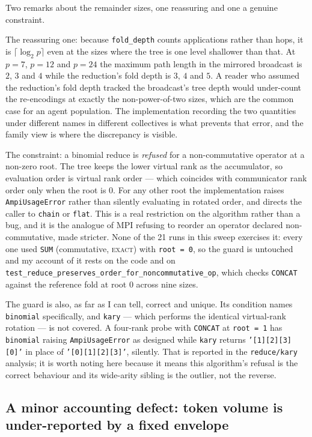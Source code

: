 \documentclass[11pt]{article}
\begin{document}
Two remarks about the remainder sizes, one reassuring and one a genuine constraint.

The reassuring one: because \texttt{fold\_depth} counts applications rather than hops, it is
$\lceil\log_2 p\rceil$ even at the sizes where the tree is one level shallower than that. At
$p=7$, $p=12$ and $p=24$ the maximum path length in the mirrored broadcast is $2$, $3$ and $4$
while the reduction's fold depth is $3$, $4$ and $5$. A reader who assumed the reduction's fold
depth tracked the broadcast's tree depth would under-count the re-encodings at exactly the
non-power-of-two sizes, which are the common case for an agent population. The implementation
recording the two quantities under different names in different collectives is what prevents
that error, and the family view is where the discrepancy is visible.

The constraint: a binomial reduce is \emph{refused} for a non-commutative operator at a non-zero
root. The tree keeps the lower virtual rank as the accumulator, so evaluation order is virtual
rank order --- which coincides with communicator rank order only when the root is $0$. For any
other root the implementation raises \texttt{AmpiUsageError} rather than silently evaluating in
rotated order, and directs the caller to \texttt{chain} or \texttt{flat}. This is a real
restriction on the algorithm rather than a bug, and it is the analogue of MPI refusing to
reorder an operator declared non-commutative, made stricter. None of the 21 runs in this sweep
exercises it: every one used \texttt{SUM} (commutative, \textsc{exact}) with \texttt{root = 0},
so the guard is untouched and my account of it rests on the code and on
\texttt{test\_reduce\_preserves\_order\_for\_noncommutative\_op}, which checks \texttt{CONCAT}
against the reference fold at root $0$ across nine sizes.

The guard is also, as far as I can tell, correct and unique. Its condition names
\texttt{binomial} specifically, and \texttt{kary} --- which performs the identical virtual-rank
rotation --- is not covered. A four-rank probe with \texttt{CONCAT} at \texttt{root = 1} has
\texttt{binomial} raising \texttt{AmpiUsageError} as designed while \texttt{kary} returns
\texttt{'[1][2][3][0]'} in place of \texttt{'[0][1][2][3]'}, silently. That is reported in the
\texttt{reduce/kary} analysis; it is worth noting here because it means this algorithm's
refusal is the correct behaviour and its wide-arity sibling is the outlier, not the reverse.

\subsection*{A minor accounting defect: token volume is under-reported by a fixed envelope}
\end{document}
